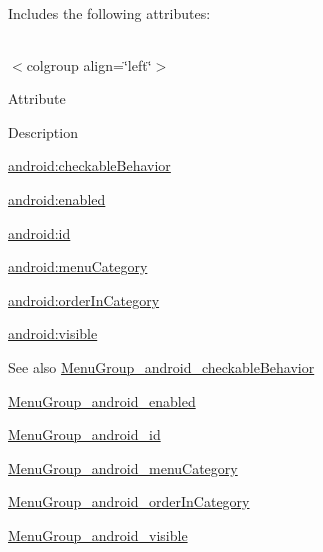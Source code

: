Includes the following attributes\+:

\tabulinesep=1mm
\begin{longtabu} spread 0pt [c]{*{0}{|X[-1]}|}
\hline
\end{longtabu}
$<$colgroup align=\char`\"{}left\char`\"{}$>$ 

Attribute

Description 

{\ttfamily \hyperlink{classandroid_1_1support_1_1design_1_1R_1_1styleable_a1dd1f9ed2abc2955dfb4e3d49f480097}{android\+:checkable\+Behavior}}

{\ttfamily \hyperlink{classandroid_1_1support_1_1design_1_1R_1_1styleable_a86f6abd170445535b48efa83a9214c35}{android\+:enabled}}

{\ttfamily \hyperlink{classandroid_1_1support_1_1design_1_1R_1_1styleable_a432ced7a651f227099d551787caa5dc8}{android\+:id}}

{\ttfamily \hyperlink{classandroid_1_1support_1_1design_1_1R_1_1styleable_af2447533946253a30d30554961e4a70c}{android\+:menu\+Category}}

{\ttfamily \hyperlink{classandroid_1_1support_1_1design_1_1R_1_1styleable_a9674d65ecf8bf01ec0a3ad6740fd1642}{android\+:order\+In\+Category}}

{\ttfamily \hyperlink{classandroid_1_1support_1_1design_1_1R_1_1styleable_a62b922817ddc433833e29afbd90027aa}{android\+:visible}}

\begin{DoxySeeAlso}{See also}
\hyperlink{classandroid_1_1support_1_1design_1_1R_1_1styleable_a1dd1f9ed2abc2955dfb4e3d49f480097}{Menu\+Group\+\_\+android\+\_\+checkable\+Behavior} 

\hyperlink{classandroid_1_1support_1_1design_1_1R_1_1styleable_a86f6abd170445535b48efa83a9214c35}{Menu\+Group\+\_\+android\+\_\+enabled} 

\hyperlink{classandroid_1_1support_1_1design_1_1R_1_1styleable_a432ced7a651f227099d551787caa5dc8}{Menu\+Group\+\_\+android\+\_\+id} 

\hyperlink{classandroid_1_1support_1_1design_1_1R_1_1styleable_af2447533946253a30d30554961e4a70c}{Menu\+Group\+\_\+android\+\_\+menu\+Category} 

\hyperlink{classandroid_1_1support_1_1design_1_1R_1_1styleable_a9674d65ecf8bf01ec0a3ad6740fd1642}{Menu\+Group\+\_\+android\+\_\+order\+In\+Category} 

\hyperlink{classandroid_1_1support_1_1design_1_1R_1_1styleable_a62b922817ddc433833e29afbd90027aa}{Menu\+Group\+\_\+android\+\_\+visible} 
\end{DoxySeeAlso}
\mbox{\label{classandroid_1_1support_1_1design_1_1R_1_1styleable_a1dd1f9ed2abc2955dfb4e3d49f480097}} 

